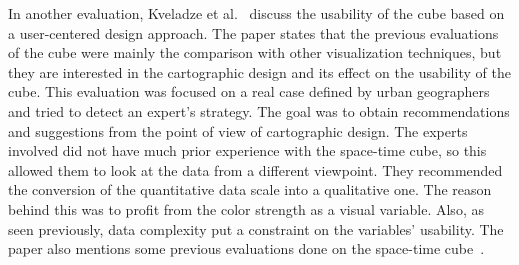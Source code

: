 In another evaluation, Kveladze et al.~\citep{kveladze2012we} discuss the usability of the cube
based on a user-centered design approach. The paper states that the previous evaluations of the cube were mainly the comparison with
other visualization techniques, but they are interested in the cartographic design and its effect on the usability of the cube.
This evaluation was focused on a real case defined by urban geographers and tried to detect an expert's strategy. The goal was to obtain
recommendations and suggestions from the point of view of cartographic design. The experts involved did not have much prior experience with the
space-time cube, so this allowed them to look at the data from a different viewpoint. They recommended the conversion of the
quantitative data scale into a qualitative one. The reason behind this was to profit from the color strength as a visual variable. Also, as
seen previously, data complexity put a constraint on the variables’ usability. The paper also mentions some previous evaluations done on the
space-time cube~\citep{kjellin2008evaluating, willems2011evaluation, kjellin2010different, vrotsou20102d}.
